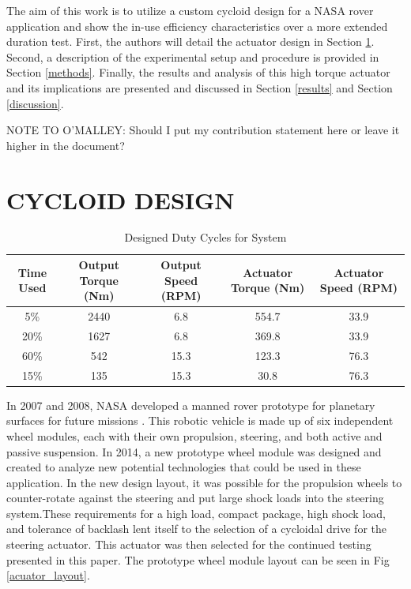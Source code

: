 \documentclass[letterpaper, 10 pt, conference]{ieeeconf}  %
\begin{document}
The aim of this work is to utilize a custom cycloid design for a NASA rover application and show the in-use efficiency characteristics over a more extended duration test. First, the authors will detail the actuator design in Section \ref{design}. Second, a description of the experimental setup and procedure is provided in Section \ref{methods}. Finally, the results and analysis of this high torque actuator and its implications are presented and discussed in Section \ref{results} and Section \ref{discussion}. 

NOTE TO O'MALLEY: Should I put my contribution statement here or leave it higher in the document?

\section{CYCLOID DESIGN} \label{design}

\begin{table}[t]
\caption{Designed Duty Cycles for System}
\label{duty_cycle}
\begin{center}
\begin{tabular}{|c||c||c| |c| |c|}
\hline
Time Used & Output Torque (Nm) & Output Speed (RPM) & Actuator Torque (Nm) & Actuator Speed (RPM)\\
\hline
5\% & 2440 & 6.8 & 554.7 & 33.9\\
\hline
20\% & 1627 & 6.8 & 369.8 & 33.9\\
\hline
60\% & 542 & 15.3 & 123.3 & 76.3\\
\hline
15\% & 135 & 15.3 & 30.8 & 76.3\\
\hline
\end{tabular}
\end{center}
\end{table}


   
In 2007 and 2008, NASA developed a manned rover prototype for planetary surfaces for future missions \cite{rover}. This robotic vehicle is made up of six independent wheel modules, each with their own propulsion, steering, and both active and passive suspension. In 2014, a new prototype wheel module was designed and created to analyze new potential technologies that could be used in these application. In the new design layout, it was possible for the propulsion wheels to counter-rotate against the steering and put large shock loads into the steering system.These requirements for a high load, compact package, high shock load, and tolerance of backlash lent itself to the selection of a cycloidal drive for the steering actuator. This actuator was then selected for the continued testing presented in this paper. The prototype wheel module layout can be seen in Fig \ref{acuator_layout}.
\end{document}
